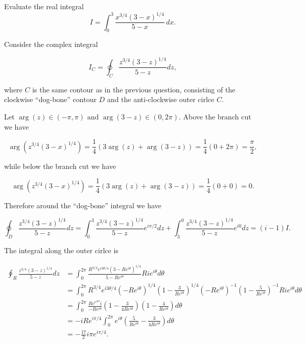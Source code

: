 \documentclass[english,a4paper,12pt]{report}
\begin{document}
{Evaluate the real integral 
\begin{equation}
    I=\int_{0}^{3} \frac{x^{3/4}(3-x)^{1/4}}{5-x}\,dx.
\end{equation}
}
{Consider the complex integral 

\begin{equation}
    I_{C} = \oint_{C} \frac{z^{3/4} (3-z)^{1/4} }{5-z}dz,  
\end{equation}

where \(C\) is the same contour as in the previous question, consisting of the clockwise ``dog-bone'' contour \(D\) and the anti-clockwise outer cirlce \(C\).

Let \(\arg (z) \in (-\pi ,\pi ) \text { and } \arg (3-z) \in (0,2\pi )\). Above the branch cut we have 

\begin{equation}
    \arg \left( z^{3/4} (3-x)^{1/4}   \right) = \frac{1}{4}(3 \arg (z) + \arg (3-z)) = \frac{1}{4}(0+2\pi ) = \frac{\pi }{2},  
\end{equation}

while below the branch cut we have 

\begin{equation}
    \arg \left( z^{3/4} (3-x)^{1/4}   \right) = \frac{1}{4} (3 \arg (z) + \arg (3-z))  =\frac{1}{4} (0+0) = 0. 
\end{equation}

Therefore around the ``dog-bone'' integral we have 

\begin{equation}
    \oint_{D} \frac{z^{3/4}(3-z)^{1/4}  }{5-z} dz = \int_{0}^{3} \frac{z^{3/4}(3-z)^{1/4}  }{5-z} e^{i\pi /2} dz + \int_{3}^{0} \frac{z^{3/4}(3-z)^{1/4}  }{5-z} e^{i0}dz = (i-1)I.
\end{equation}

The integral along the outer cirlce is 

\begin{equation}
    \begin{aligned} 
    \oint_{R} \frac{z^{3/4}(3-z)^{1/4}  }{5-z} dz &= \int_{0}^{2\pi } \frac{R^{3/4}e^{i 3 \theta /4} (3-R e^{i \theta } )^{1/4}}{5-Re^{i \theta } } Ri e^{i \theta }d \theta \\
    &= \int_{0}^{2\pi } R^{3/4}e^{i 3 \theta /4} (-Re^{ i \theta } )^{1/4} \left( 1-\frac{3}{Re^{i \theta } }  \right)^{1/4} (-Re^{ i \theta } )^{-1} \left( 1-\frac{5}{Re^{ i \theta } }  \right)^{-1} Ri e^{ i \theta }  d \theta \\
    &= \int_{0}^{2\pi } \frac{Re^{e^{2i \theta } } i}{-Re^{ i \theta } } \left( 1-\frac{3}{4Re^{i \theta } }  \right)   \left( 1-\frac{4}{Re^{ i \theta } }  \right) d \theta \\
    &= -iR e^{i \pi /4} \int_{0}^{2\pi } e^{ i \theta } \left( \frac{5}{Re^{i \theta } } - \frac{3}{4R e^{i \theta } }  \right)    d \theta \\
    &= -\frac{17}{2} i \pi e^{i \pi /4}.
    \end{aligned}   
\end{equation}

}
\end{document}
